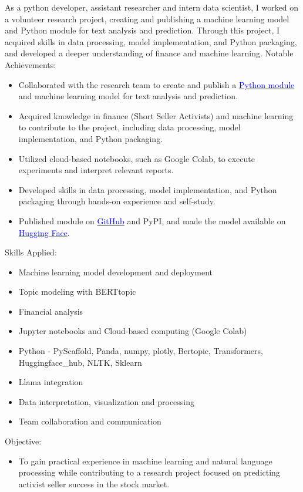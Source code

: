     {
    As a python developer, assistant researcher and intern data scientist, I worked on a volunteer research project, 
    creating and publishing a machine learning model and Python module for text analysis and prediction. 
    Through this project, I acquired skills in data processing, model implementation, 
    and Python packaging, and developed a deeper understanding of finance and machine learning.
    \newline
    Notable Achievements:
    \begin{itemize}
        \item Collaborated with the research team to create and publish a \href{https://pypi.org/project/short-activist-predictor/}{\textcolor{blue}{Python module}} and machine learning model for text analysis and prediction.
        \item Acquired knowledge in finance (Short Seller Activists) and machine learning to contribute to the project, including data processing, model implementation, and Python packaging.
        \item Utilized cloud-based notebooks, such as Google Colab, to execute experiments and interpret relevant reports.
        \item Developed skills in data processing, model implementation, and Python packaging through hands-on experience and self-study.
        \item Published module on \href{https://github.com/DanGlChris/short_activist_predictor}{\textcolor{blue}{GitHub}} and PyPI, and made the model available on \href{https://huggingface.co/collections/DanGlChris/short-activists-predict-6534a69d1922c31a9b0198f9}{\textcolor{blue}{Hugging Face}}.
    \end{itemize}
    \vspace{1mm}
    Skills Applied:
    \begin{itemize}
        \item Machine learning model development and deployment
        \item Topic modeling with BERTtopic
        \item Financial analysis 
        \item Jupyter notebooks and Cloud-based computing (Google Colab)
        \item Python - PyScaffold, Panda, numpy, plotly, Bertopic, Transformers, Huggingface\_hub, NLTK, Sklearn
        \item Llama integration
        \item Data interpretation, visualization and processing
        \item Team collaboration and communication
    \end{itemize}        
    \vspace{1mm}
    Objective:
    \begin{itemize}
        \item To gain practical experience in machine learning and natural language processing while contributing to a research project focused on predicting activist seller success in the stock market.
    \end{itemize}
    }
    



